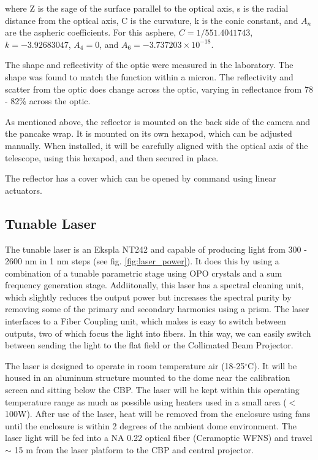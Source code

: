 \documentclass[SE,authoryear,lsstdraft,toc]{lsstdoc}
\begin{document}
where Z is the sage of the surface parallel to the optical axis, s is the radial distance from the optical axis, C is the curvature, k is the conic constant, and $A_{n}$ are the aspheric coefficients.
 For this asphere, $C=1/551.4041743$, $k=-3.92683047$, $A_{4}=0$, and $A_{6} = -3.737203\times10^{-18}$.

The shape and reflectivity of the optic were measured in the laboratory. The shape was found to match the function within a micron. The reflectivity and scatter from the optic does change across the optic, varying in reflectance from 78 - 82\% across the optic.

As mentioned above, the reflector is mounted on the back side of the camera and the pancake wrap. It is mounted on its own hexapod, which can be adjusted manually. When installed, it will be carefully aligned with the optical axis of the telescope, using this hexapod, and then secured in place.

The reflector has a cover which can be opened by command using linear actuators. 

\subsection{Tunable Laser}
The tunable laser is an Ekspla NT242 and capable of producing light from 300 - 2600 nm in 1 nm steps (see fig. \ref{fig:laser_power}). It does this by using a combination of a tunable parametric stage using OPO crystals and a sum frequency generation stage. 
Addiitonally, this laser has a spectral cleaning unit, which slightly reduces the output power but increases the spectral purity by removing some of the primary and secondary harmonics using a prism. The laser interfaces to a Fiber Coupling unit, which makes is easy to switch between outputs, two of which focus the light into fibers. 
In this way, we can easily switch between sending the light to the flat field or the Collimated Beam Projector. 

The laser is designed to operate in room temperature air (18-25$^{\circ}$C). 
It will be housed in an aluminum structure mounted to the dome near the calibration screen and sitting below the CBP. 
The laser will be kept within this operating temperature range as much as possible using heaters used in a small area ($<$100W). After use of the laser, heat will be removed from the enclosure using fans until the enclosure is within 2 degrees of the ambient dome environment.
The laser light will be fed into a NA 0.22 optical fiber (Ceramoptic WFNS) and travel $\sim$ 15 m from the laser platform to the CBP and central projector. 
\end{document}
